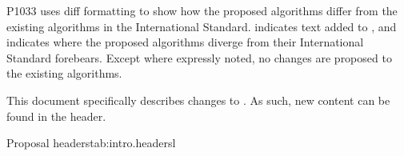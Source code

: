 \pnum
P1033 uses diff formatting to show how the proposed algorithms differ from the existing algorithms
in the International Standard.  indicates text added to
, and  indicates where the proposed algorithms diverge
from their International Standard forebears. Except where expressly noted, no changes are proposed
to the existing algorithms.

\pnum
This document specifically describes changes to . As such, new content can be found
in the  header.

\begin{floattable}{Proposal headers}{tab:intro.headers}{l}
\topline
{}\\
\bottomline
\end{floattable}
